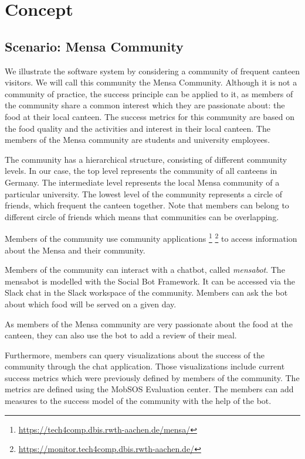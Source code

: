 \chapter{Concept}\label{cha:concept}
\section{Scenario: Mensa Community}
We illustrate the software system by considering a community of frequent canteen visitors. We will call this community the Mensa Community.
Although it is not a community of practice, the success principle can be applied to it, as members of the community share a common interest which they are passionate about: the food at their local canteen.
The success metrics for this community are based on the food quality and the activities and interest in their local canteen.
The members of the Mensa community are students and university employees.

The community has a hierarchical structure, consisting of different community levels.
In our case, the top level represents the community of all canteens in Germany.
The intermediate level represents the local Mensa community of a particular university.
The lowest level of the community represents a circle of friends, which frequent the canteen together. Note that members can belong to different circle of friends which means that communities can be overlapping.

Members of the community use community applications \footnote{\url{https://tech4comp.dbis.rwth-aachen.de/mensa/}}
\footnote{\url{https://monitor.tech4comp.dbis.rwth-aachen.de/}} to access information about the Mensa and their community.

Members of the community can interact with a chatbot, called \emph{mensabot}. The mensabot is modelled with  the Social Bot Framework. It can be accessed via the Slack chat in the Slack workspace of the community. Members can ask the bot about which food will be served on a given day.

As members of the Mensa community are very passionate about the food at the canteen, they can also use the bot to add a review of their meal.

Furthermore, members can query visualizations about the success of the community through the chat application. Those visualizations include current success metrics which were previously defined by members of the community. The metrics are defined using the MobSOS Evaluation center. The members can add measures to the success model of the community with the help of the bot.

